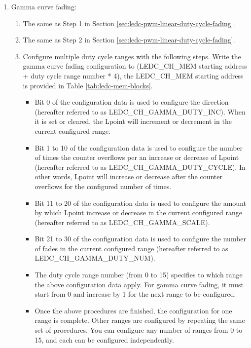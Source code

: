 \documentclass[main\_\_EN.tex]{subfiles}
\begin{document}
\begin{enumerate}
\begin{enumerate}
\begin{enumerate}
        \end{enumerate}
        \item Gamma curve fading:
        \begin{enumerate}
            \item The same as Step 1 in Section \ref{sec:ledc-pwm-linear-duty-cycle-fading}.
            \item The same as Step 2 in Section \ref{sec:ledc-pwm-linear-duty-cycle-fading}.
            \item Configure multiple duty cycle ranges with the following steps. Write the gamma curve fading configuration to (LEDC\_CH\_MEM starting address + duty cycle range number * 4), the LEDC\_CH\_MEM starting address is provided in Table \ref{tab:ledc-mem-blocks}.
            \begin{itemize}
                \item Bit 0 of the configuration data is used to configure the direction (hereafter referred to as LEDC\_CH\_GAMMA\_DUTY\_INC). When it is set or cleared, the Lpoint will increment or decrement in the current configured range.
                \item Bit 1 to 10 of the configuration data is used to configure the number of times the counter overflows per an increase or decrease of Lpoint (hereafter referred to as LEDC\_CH\_GAMMA\_DUTY\_CYCLE). In other words, Lpoint will increase or decrease after the counter overflows for the configured number of times.
                \item Bit 11 to 20 of the configuration data is used to configure the amount by which Lpoint increase or decrease in the current configured range (hereafter referred to as LEDC\_CH\_GAMMA\_SCALE).
                \item Bit 21 to 30 of the configuration data is used to configure the number of fades in the current configured range (hereafter referred to as LEDC\_CH\_GAMMA\_DUTY\_NUM).
                \item The duty cycle range number (from 0 to 15) specifies to which range the above configuration data apply. For gamma curve fading, it must start from 0 and increase by 1 for the next range to be configured.
                \item Once the above procedures are finished, the configuration for one range is complete. Other ranges are configured by repeating the same set of procedures. You can configure any number of ranges from 0 to 15, and each can be configured independently.

\end{itemize}
\end{enumerate}
\end{enumerate}
\end{enumerate}
\end{document}
